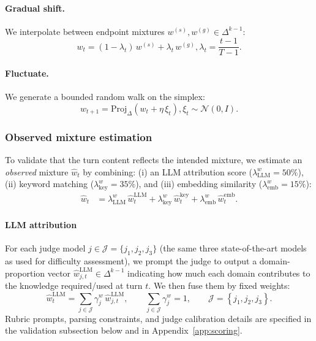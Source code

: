 \paragraph{Gradual shift.}
We interpolate between endpoint mixtures $w^{(s)},w^{(g)}\in\Delta^{k-1}$:
\begin{equation}
\label{eq:w_gradual_final}
w_t=(1-\lambda_t)\,w^{(s)}+\lambda_t\,w^{(g)}, \lambda_t=\frac{t-1}{T-1}.
\end{equation}

\paragraph{Fluctuate.}
We generate a bounded random walk on the simplex:
\begin{equation}
\label{eq:w_fluctuate_final}
w_{t+1}=\mathrm{Proj}_{\Delta}\left(w_t+\eta\,\xi_t\right), \xi_t\sim\mathcal{N}(0,I).
\end{equation}

\subsubsection{Observed mixture estimation}
\label{app:mixture_observed}

To validate that the turn content reflects the intended mixture, we estimate an \emph{observed} mixture $\hat{w}_t$ by combining:
(i) an LLM attribution score ($\lambda^{w}_{\mathrm{LLM}} = 50\%$), (ii) keyword matching ($\lambda^{w}_{\mathrm{key}} = 35\%$), and (iii) embedding similarity ($\lambda^{w}_{\mathrm{emb}} = 15\%$):
\begin{equation}
\label{eq:wt_hat_mix}
\begin{aligned}
\hat{w}_t &= \lambda^{w}_{\mathrm{LLM}}\,\hat{w}^{\mathrm{LLM}}_t
 + \lambda^{w}_{\mathrm{key}}\,\hat{w}^{\mathrm{key}}_t
 + \lambda^{w}_{\mathrm{emb}}\,\hat{w}^{\mathrm{emb}}_t.
\end{aligned}
\end{equation}

\paragraph{LLM attribution}
For each judge model $j\in\mathcal{J}=\{j_1,j_2,j_3\}$ (the same three state-of-the-art models as used for difficulty assessment), we prompt the judge to output a domain-proportion vector $\hat{w}^{\text{LLM}}_{j,t}\in\Delta^{k-1}$ indicating how much each domain contributes to the knowledge required/used at turn $t$. We then fuse them by fixed weights:
\begin{equation}
\label{eq:wt_llm_ensemble}
\hat{w}^{\mathrm{LLM}}_{t}
= \sum_{j\in\mathcal{J}} \gamma^{w}_{j}\, \hat{w}^{\mathrm{LLM}}_{j,t}, \qquad
\sum_{j\in\mathcal{J}} \gamma^{w}_{j} = 1,
\qquad
\mathcal{J}=\left\{j_1,j_2,j_3\right\}.
\end{equation}
Rubric prompts, parsing constraints, and judge calibration details are specified in the validation subsection below and in Appendix~\ref{app:scoring}.

